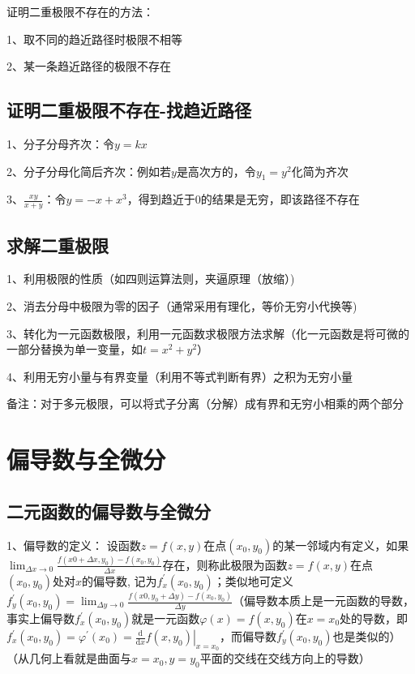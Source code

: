证明二重极限不存在的方法：

1、取不同的趋近路径时极限不相等

2、某一条趋近路径的极限不存在



\subsection{证明二重极限不存在-找趋近路径}

1、分子分母齐次：令$y=kx$

2、分子分母化简后齐次：例如若$y$是高次方的，令$y_1=y^2$化简为齐次

3、$\frac{xy}{x+y}$：令$y=-x+x^3$，得到趋近于0的结果是无穷，即该路径不存在



\subsection{求解二重极限}

1、利用极限的性质（如四则运算法则，夹逼原理（放缩）)

2、消去分母中极限为零的因子（通常采用有理化，等价无穷小代换等)

3、转化为一元函数极限，利用一元函数求极限方法求解（化一元函数是将可微的一部分替换为单一变量，如$t=x^2+y^2$）

4、利用无穷小量与有界变量（利用不等式判断有界）之积为无穷小量

备注：对于多元极限，可以将式子分离（分解）成有界和无穷小相乘的两个部分

\section{偏导数与全微分}



\subsection{二元函数的偏导数与全微分}

1、偏导数的定义： 设函数$z=f(x, y)$在点$\left(x_{0}, y_{0}\right)$的某一邻域内有定义，如果$\lim_{\Delta x \rightarrow 0} \frac{f\left(x{0}+\Delta x, y_{0}\right)-f\left(x_{0}, y_{0}\right)}{\Delta x}$存在，则称此极限为函数$z=f(x, y)$在点$\left(x_{0}, y_{0}\right)$处对$x$的偏导数, 记为$f_{x}^{\prime}\left(x_{0}, y_{0}\right)$；类似地可定义$f_{y}^{\prime}\left(x_{0}, y_{0}\right)=\lim_{\Delta y \rightarrow 0} \frac{f\left(x{0}, y_{0}+\Delta y\right)-f\left(x_{0}, y_{0}\right)}{\Delta y}$（偏导数本质上是一元函数的导数，事实上偏导数$f_{x}^{\prime}\left(x_{0}, y_{0}\right)$就是一元函数$\varphi(x)=f\left(x, y_{0}\right)$在$x=x_{0}$处的导数，即$f_{x}^{\prime}\left(x_{0}, y_{0}\right)=\varphi^{\prime}\left(x_{0}\right)=\left.\frac{\mathrm{d}}{\mathrm{d} x} f\left(x, y_{0}\right)\right|_{x=x_{0}}$，而偏导数$f_{y}^{\prime}\left(x_{0}, y_{0}\right)$也是类似的）（从几何上看就是曲面与$x=x_0,y=y_0$平面的交线在交线方向上的导数）


